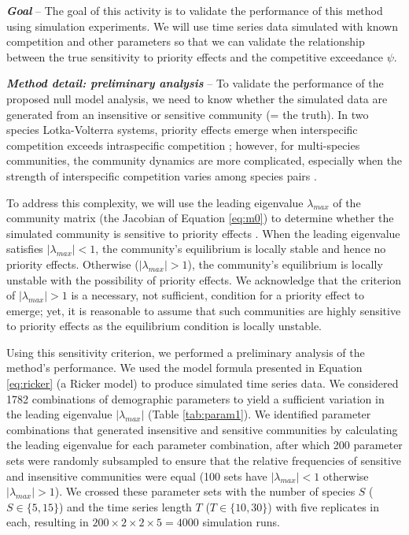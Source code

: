 \documentclass[12pt, class=article, crop=false]{standalone}
\begin{document}
\textbf{\textit{Goal}} -- 
The goal of this activity is to validate the performance of this method using simulation experiments.
We will use time series data simulated with known competition and other parameters so that we can validate the relationship between the true sensitivity to priority effects and the competitive exceedance $\psi$.

\textbf{\textit{Method detail: preliminary analysis}} -- 
To validate the performance of the proposed null model analysis, we need to know whether the simulated data are generated from an insensitive or sensitive community (= the truth).
In two species Lotka-Volterra systems, priority effects emerge when interspecific competition exceeds intraspecific competition \citep{ke_coexistence_2018}; however, for multi-species communities, the community dynamics are more complicated, especially when the strength of interspecific competition varies among species pairs \citep{carroll_niche_2011, barabas_chessons_2018}.

To address this complexity, we will use the leading eigenvalue $\lambda_{max}$ of the community matrix (the Jacobian of Equation \ref{eq:m0}) to determine whether the simulated community is sensitive to priority effects \citep{otto_biologists_2011}.
When the leading eigenvalue satisfies $|\lambda_{max}| < 1$, the community's equilibrium is locally stable and hence no priority effects.
Otherwise ($|\lambda_{max}| > 1$), the community's equilibrium is locally unstable with the possibility of priority effects.
We acknowledge that the criterion of $|\lambda_{max}| > 1$ is a necessary, not sufficient, condition for a priority effect to emerge; yet, it is reasonable to assume that such communities are highly sensitive to priority effects as the equilibrium condition is locally unstable. 

Using this sensitivity criterion, we performed a preliminary analysis of the method's performance.
We used the model formula presented in Equation \ref{eq:ricker} (a Ricker model) to produce simulated time series data.
We considered 1782 combinations of demographic parameters to yield a sufficient variation in the leading eigenvalue $|\lambda_{max}|$ (Table \ref{tab:param1}).
We identified parameter combinations that generated insensitive and sensitive communities by calculating the leading eigenvalue for each parameter combination, after which 200 parameter sets were randomly subsampled to ensure that the relative frequencies of sensitive and insensitive communities were equal (100 sets have $|\lambda_{max}| < 1$ otherwise $|\lambda_{max}| > 1$).
We crossed these parameter sets with the number of species $S$ ($S \in \{5, 15\}$) and the time series length $T$ ($T \in \{10, 30\}$) with five replicates in each, resulting in $200 \times 2 \times 2 \times 5 = 4000$ simulation runs.
\end{document}
